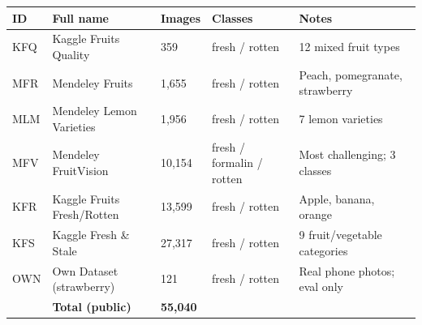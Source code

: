 \documentclass[12pt, a4paper]{article}
\begin{document}
\begin{table}[h]
\centering
\begin{tabular}{L{1.2cm} L{3.5cm} L{1.5cm} L{2cm} L{4cm}}
\toprule
\textbf{ID} & \textbf{Full name} & \textbf{Images} & \textbf{Classes} & \textbf{Notes} \\
\midrule
KFQ & Kaggle Fruits Quality       &    359 & fresh / rotten & 12 mixed fruit types \\
MFR & Mendeley Fruits              &  1,655 & fresh / rotten & Peach, pomegranate, strawberry \\
MLM & Mendeley Lemon Varieties     &  1,956 & fresh / rotten & 7 lemon varieties \\
MFV & Mendeley FruitVision         & 10,154 & fresh / formalin / rotten & Most challenging; 3 classes \\
KFR & Kaggle Fruits Fresh/Rotten   & 13,599 & fresh / rotten & Apple, banana, orange \\
KFS & Kaggle Fresh \& Stale        & 27,317 & fresh / rotten & 9 fruit/vegetable categories \\
OWN & Own Dataset (strawberry)     &    121 & fresh / rotten & Real phone photos; eval only \\
\midrule
    & \textbf{Total (public)}      & \textbf{55,040} & & \\
\bottomrule
\end{tabular}
\end{table}
\end{document}
